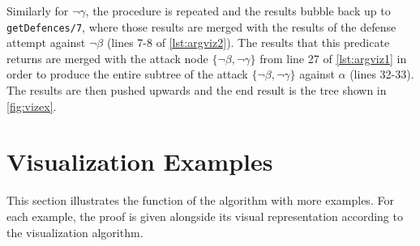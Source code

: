 \documentclass[11pt,twoside,a4paper]{report}
\begin{document}
Similarly for $\neg\gamma$, the procedure is repeated and the results bubble back up to \lstinline$getDefences/7$, where those results are merged with the results of the defense attempt against $\neg\beta$ (lines 7-8 of \autoref{lst:argviz2}). The results that this predicate returns are merged with the attack node $\{\neg\beta, \neg\gamma\}$ from line 27 of \autoref{lst:argviz1} in order to produce the entire subtree of the attack $\{\neg\beta, \neg\gamma\}$ against $\alpha$ (lines 32-33). The results are then pushed upwards and the end result is the tree shown in \autoref{fig:vizex}.

\section{Visualization Examples}
\label{sec:vizex}
This section illustrates the function of the algorithm with more examples. For each example, the proof is given alongside its visual representation according to the visualization algorithm.
\end{document}
